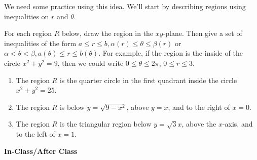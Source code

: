 We need some practice using this idea. We'll start by describing regions using inequalities on $r$ and $\theta$.  




\begin{problem}
For each region $R$ below, draw the region in the $xy$-plane. Then give a set of inequalities of the form $a\leq r\leq b, \alpha(r)\leq \theta \leq \beta(r)$ or $\alpha<\theta<\beta, a(\theta)\leq r\leq b(\theta)$. For example, if the region is the inside of the circle $x^2+y^2=9$, then we could write $0\leq \theta\leq 2\pi$, $0\leq r\leq 3$. 
\begin{enumerate}
 \item The region $R$ is the quarter circle in the first quadrant inside the circle $x^2+y^2=25$.
 \item The region $R$ is below $y=\sqrt{9-x^2}$, above $y=x$, and to the right of $x=0$.  
 \item The region $R$ is the triangular region below $y=\sqrt 3 x$, above the $x$-axis, and to the left of $x=1$. 
\end{enumerate}
\end{problem}

\newpage
\Large \textbf{In-Class/After Class}
\normalsize

